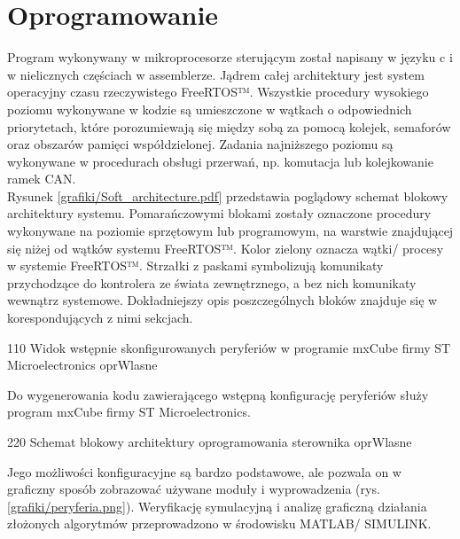 \section{Oprogramowanie}
\label{s:oprogramowanie}

Program wykonywany w mikroprocesorze sterującym został napisany w języku c i w nielicznych częściach w assemblerze. Jądrem całej architektury jest system operacyjny czasu rzeczywistego FreeRTOS™. Wszystkie procedury wysokiego poziomu wykonywane w kodzie są umieszczone w wątkach o odpowiednich priorytetach, które porozumiewają się między sobą za pomocą kolejek, semaforów oraz obszarów pamięci współdzielonej. Zadania najniższego poziomu są wykonywane \linebreak w procedurach obsługi przerwań, np. komutacja lub kolejkowanie ramek CAN. \\

Rysunek \ref{grafiki/Soft_architecture.pdf} przedstawia poglądowy schemat blokowy architektury systemu. Pomarańczowymi blokami zostały oznaczone procedury wykonywane na poziomie sprzętowym lub programowym, na warstwie znajdującej się niżej od wątków systemu FreeRTOS™. Kolor zielony oznacza wątki/ procesy w systemie FreeRTOS™. Strzałki z paskami symbolizują komunikaty przychodzące do kontrolera ze świata zewnętrznego, a bez nich komunikaty wewnątrz systemowe. Dokładniejszy opis poszczególnych bloków znajduje się w korespondujących z nimi sekcjach.

	{110}
	{Widok wstępnie skonfigurowanych peryferiów w programie mxCube firmy ST Microelectronics}
	{oprWlasne}
	
Do wygenerowania kodu zawierającego wstępną konfigurację peryferiów służy program mxCube firmy ST Microelectronics.
	
	{220}
	{Schemat blokowy architektury oprogramowania sterownika}
	{oprWlasne}
	
\clearpage

Jego możliwości konfiguracyjne są bardzo podstawowe, ale pozwala on w graficzny sposób zobrazować używane moduły i wyprowadzenia (rys. \ref{grafiki/peryferia.png}). Weryfikację symulacyjną i analizę graficzną działania złożonych algorytmów przeprowadzono \linebreak w środowisku MATLAB/ SIMULINK.













\clearpage
















\clearpage